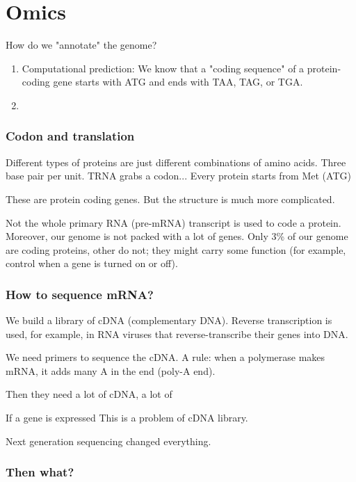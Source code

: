 \documentclass[main.tex]{subfiles}
\begin{document}
\section{Omics}

How do we "annotate" the genome?

\begin{enumerate}[noitemsep]
	\item Computational prediction: We know that a "coding sequence" of a protein-coding gene starts with ATG and ends with TAA, TAG, or TGA.
	\item %
\end{enumerate}

\subsubsection{Codon and translation}

Different types of proteins are just different combinations of amino acids.
Three base pair per unit.
TRNA grabs a codon...
Every protein starts from Met (ATG)

These are protein coding genes.
But the structure is much more complicated.

Not the whole primary RNA (pre-mRNA) transcript is used to code a protein.
Moreover, our genome is not packed with a lot of genes.
Only 3\% of our genome are coding proteins, other do not; they might carry some function (for example, control when a gene is turned on or off).

\subsubsection{How to sequence mRNA?}

We build a library of cDNA (complementary DNA).
Reverse transcription is used, for example, in RNA viruses that reverse-transcribe their genes into DNA.

We need primers to sequence the cDNA.
A rule: when a polymerase makes mRNA, it adds many A in the end (poly-A end).

Then they need a lot of cDNA, a lot of 

If a gene is expressed 
This is a problem of cDNA library.

Next generation sequencing changed everything.

\subsubsection{Then what?}
\end{document}
